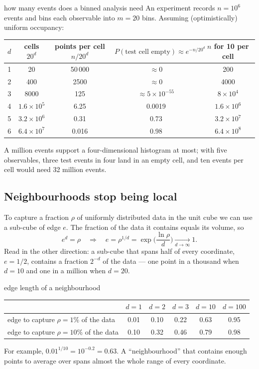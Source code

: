 \documentclass[11pt]{article}
\begin{document}
\begin{worked}{how many events does a binned analysis need}
An experiment records $n = 10^6$ events and bins each observable into $m = 20$ bins. Assuming (optimistically)
uniform occupancy:

\begin{center}\small
\begin{tabular}{@{}ccccc@{}}\toprule
$d$ & cells $20^d$ & points per cell $n/20^d$ & $P(\text{test cell empty}) \approx e^{-n/20^d}$ & $n$ for 10 per cell \\ \midrule
1 & 20 & 50\,000 & $\approx 0$ & 200 \\
2 & 400 & 2500 & $\approx 0$ & 4000 \\
3 & 8000 & 125 & $\approx 5 \times 10^{-55}$ & $8 \times 10^{4}$ \\
4 & $1.6 \times 10^5$ & 6.25 & 0.0019 & $1.6 \times 10^{6}$ \\
5 & $3.2 \times 10^6$ & 0.31 & 0.73 & $3.2 \times 10^{7}$ \\
6 & $6.4 \times 10^7$ & 0.016 & 0.98 & $6.4 \times 10^{8}$ \\ \bottomrule
\end{tabular}
\end{center}
A million events support a four-dimensional histogram at most; with five observables, three test events in four land in
an empty cell, and ten events per cell would need 32 million events.
\end{worked}

\subsection{Neighbourhoods stop being local}\label{sec:edge}

To capture a fraction $\rho$ of uniformly distributed data in the unit cube we can use a sub-cube of edge $e$. The
fraction of the data it contains equals its volume, so
\[
  e^d = \rho \quad\Longrightarrow\quad e = \rho^{1/d} = \exp\Big(\frac{\ln \rho}{d}\Big) \xrightarrow[d \to \infty]{} 1 .
\]
Read in the other direction: a sub-cube that spans half of every coordinate, $e = 1/2$, contains a fraction $2^{-d}$
of the data --- one point in a thousand when $d = 10$ and one in a million when $d = 20$.

\begin{worked}{edge length of a neighbourhood}
\begin{center}\small
\begin{tabular}{@{}lccccc@{}}\toprule
 & $d = 1$ & $d = 2$ & $d = 3$ & $d = 10$ & $d = 100$ \\ \midrule
edge to capture $\rho = 1\%$ of the data & 0.01 & 0.10 & 0.22 & 0.63 & 0.95 \\
edge to capture $\rho = 10\%$ of the data & 0.10 & 0.32 & 0.46 & 0.79 & 0.98 \\ \bottomrule
\end{tabular}
\end{center}
For example, $0.01^{1/10} = 10^{-0.2} = 0.63$. A ``neighbourhood'' that contains enough points to average over spans
almost the whole range of every coordinate.
\end{worked}
\end{document}
